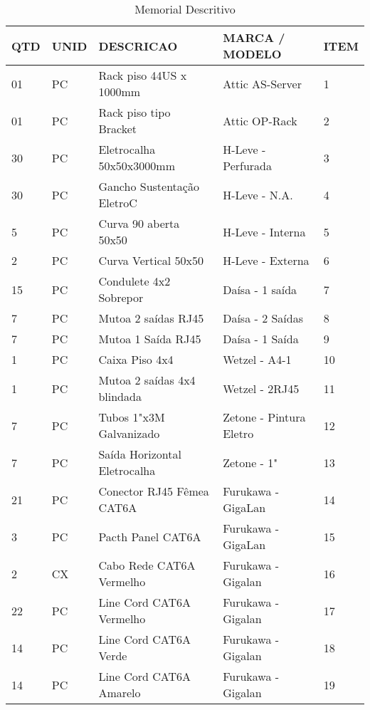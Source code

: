 \begin{table}[h!]
\centering
\caption{Memorial Descritivo}
\label{Memorial Descritivo}
\begin{tabular}{|l|l|l|l|l|}
\hline
QTD & UNID & DESCRICAO                     & MARCA / MODELO          & ITEM \\ \hline
01  & PC   & Rack piso 44US x 1000mm       & Attic AS-Server         & 1    \\ \hline
01  & PC   & Rack piso tipo Bracket        & Attic OP-Rack           & 2    \\ \hline
30  & PC   & Eletrocalha 50x50x3000mm      & H-Leve - Perfurada      & 3    \\ \hline
30  & PC   & Gancho Sustentação EletroC    & H-Leve - N.A.           & 4    \\ \hline
5   & PC   & Curva 90 aberta 50x50         & H-Leve - Interna        & 5    \\ \hline
2   & PC   & Curva Vertical 50x50          & H-Leve - Externa        & 6    \\ \hline
15  & PC   & Condulete 4x2 Sobrepor        & Daísa - 1 saída         & 7    \\ \hline
7   & PC   & Mutoa 2 saídas RJ45           & Daísa - 2 Saídas        & 8    \\ \hline
7   & PC   & Mutoa 1 Saída RJ45            & Daísa - 1 Saída         & 9    \\ \hline
1   & PC   & Caixa Piso 4x4                & Wetzel - A4-1           & 10   \\ \hline
1   & PC   & Mutoa 2 saídas 4x4 blindada   & Wetzel - 2RJ45          & 11   \\ \hline
7   & PC   & Tubos 1"x3M Galvanizado       & Zetone - Pintura Eletro & 12   \\ \hline
7   & PC   & Saída Horizontal Eletrocalha  & Zetone - 1"             & 13   \\ \hline
21  & PC   & Conector RJ45 Fêmea CAT6A     & Furukawa - GigaLan      & 14   \\ \hline
3   & PC   & Pacth Panel CAT6A             & Furukawa - GigaLan      & 15   \\ \hline
2   & CX   & Cabo Rede CAT6A Vermelho      & Furukawa - Gigalan      & 16   \\ \hline
22  & PC   & Line Cord CAT6A Vermelho      & Furukawa - Gigalan      & 17   \\ \hline
14  & PC   & Line Cord CAT6A Verde         & Furukawa - Gigalan      & 18   \\ \hline
14  & PC   & Line Cord CAT6A Amarelo       & Furukawa - Gigalan      & 19   \\ \hline

\end{tabular}
\end{table}
